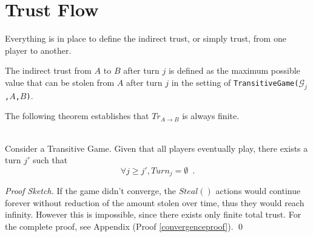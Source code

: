 \documentclass[11pt]{llncs}
\theoremstyle{definition}
\newenvironment{proofsketch}{\textit{Proof Sketch.}}{\qed \bigskip \ \\}
\begin{document}
  \section{Trust Flow}
    Everything is in place to define the indirect trust, or simply trust, from one player to another.
    \begin{definition}
       The indirect trust from $A$ to $B$ after turn $j$ is defined as the maximum possible value that can be stolen from
       $A$ after turn $j$ in the setting of \texttt{TransitiveGame(}$\mathcal{G}_j$\texttt{,}$A$\texttt{,}$B$\texttt{)}.
    \end{definition}
    The following theorem establishes that $Tr_{A \rightarrow B}$ is always finite.
    \begin{theorem} \ \\
       \label{convergence}
       Consider a Transitive Game.
       Given that all players eventually play, there exists a turn $j'$ such that
       \begin{equation}
          \forall j \geq j', Turn_j = \emptyset \enspace.
       \end{equation}
    \end{theorem}
    \begin{proofsketch}
       If the game didn't converge, the $Steal\left(\right)$ actions would continue forever without reduction of the amount
       stolen over time, thus they would reach infinity. However this is impossible, since there exists only finite total
       trust. For the complete proof, see Appendix (Proof \ref{convergenceproof}).
    \end{proofsketch}
\end{document}
